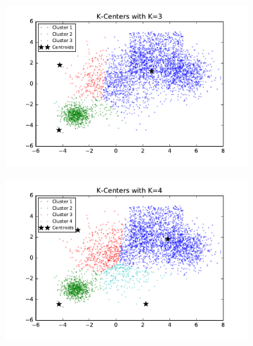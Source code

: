 \begin{description}
\begin{description}
\begin{figure}[!h]
        \centering
        \begin{subfigure}[b]{0.475\textwidth}
            \centering
            \includegraphics[width=\textwidth]{./figures/bigClustering_kCenter_3.pdf}
        \end{subfigure}
        \hfill
        \begin{subfigure}[b]{0.475\textwidth}  
            \centering 
            \includegraphics[width=\textwidth]{./figures/bigClustering_kCenter_4.pdf}
        \end{subfigure}
        \begin{subfigure}[b]{0.475\textwidth}  
            \centering 

\end{subfigure}
\end{figure}
\end{description}
\end{description}
